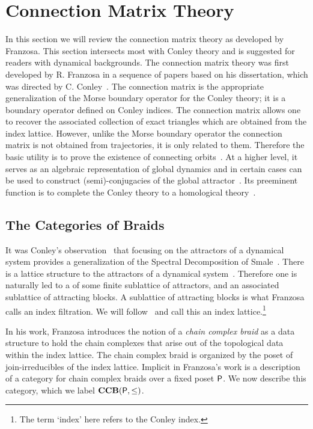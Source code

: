 
\section{Connection Matrix Theory}\label{sec:CMT}

In this section we will review the connection matrix theory as developed by Franzosa.  This section intersects most with Conley theory and is suggested for readers with dynamical backgrounds.  The connection matrix theory was first developed by R. Franzosa in a sequence of papers based on his dissertation, which was directed by C. Conley~\cite{fran2,fran,fran3}.  The connection matrix is the appropriate generalization of the Morse boundary operator for the Conley theory; it is a boundary operator defined on Conley indices.   The connection matrix allows one to recover the associated collection of exact triangles which are obtained from the index lattice.  However, unlike the Morse boundary operator the connection matrix is not obtained from trajectories, it is only related to them.  Therefore the basic utility is to prove the existence of connecting orbits~\cite{mpmw}.  At a higher level, it serves as an algebraic representation of global dynamics and in certain cases can be used to construct (semi)-conjugacies of the global attractor~\cite{dhmo,mcmodels,scalar}. Its preeminent function is to complete the Conley theory to a homological theory~\cite{mc}.  





\subsection{The Categories of Braids}
It was Conley's observation~\cite{conley} that focusing on the attractors of a dynamical system provides a generalization of the Spectral Decomposition of Smale~\cite[Theorem 6.2]{smale}.  There is a lattice structure to the attractors of a dynamical system~\cite{robbin:salamon2,lsa,lsa2}.  Therefore one is naturally led to a of some finite sublattice of attractors, and an associated sublattice of attracting blocks.  A sublattice of attracting blocks is what Franzosa calls an index filtration.  We will follow~\cite{lsa} and call this an index lattice.\footnote{The term `index' here refers to the Conley index.}

In his work, Franzosa introduces the notion of a {\em chain complex braid} as a data structure to hold the chain complexes that arise out of the topological data within the index lattice.  The chain complex braid is organized by the poset of join-irreducibles of the index lattice.  Implicit in Franzosa's work is a description of a category for chain complex braids over a fixed poset ${\mathsf P}$.  We now describe this category, which we label ${\bf CCB}({\mathsf P},\leq)$.  

